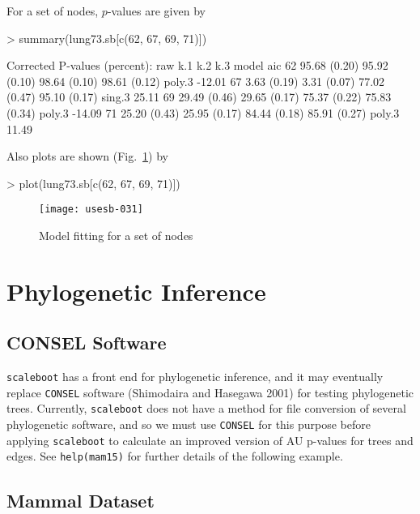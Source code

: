 \documentclass[a4paper]{amsart}
\begin{document}
For a set of nodes, $p$-values are given by
\begin{Schunk}
\begin{Sinput}
> summary(lung73.sb[c(62, 67, 69, 71)])
\end{Sinput}
\begin{Soutput}
Corrected P-values (percent):
   raw          k.1          k.2          k.3          model  aic    
62 95.68 (0.20) 95.92 (0.10) 98.64 (0.10) 98.61 (0.12) poly.3 -12.01 
67  3.63 (0.19)  3.31 (0.07) 77.02 (0.47) 95.10 (0.17) sing.3  25.11 
69 29.49 (0.46) 29.65 (0.17) 75.37 (0.22) 75.83 (0.34) poly.3 -14.09 
71 25.20 (0.43) 25.95 (0.17) 84.44 (0.18) 85.91 (0.27) poly.3  11.49 
\end{Soutput}
\end{Schunk}
Also plots are shown (Fig.~\ref{fig:lung73nodes}) by
\begin{Schunk}
\begin{Sinput}
> plot(lung73.sb[c(62, 67, 69, 71)])
\end{Sinput}
\end{Schunk}
\begin{figure}
\begin{center}
\texttt{[image: usesb-031]}
\caption{Model fitting for a set of nodes} \label{fig:lung73nodes}
\end{center}
\end{figure}

\section{Phylogenetic Inference}

\subsection{CONSEL Software}

{\tt scaleboot} has a front end for phylogenetic inference, and it may
eventually replace {\tt CONSEL} software (Shimodaira and Hasegawa
2001) for testing phylogenetic trees. Currently, {\tt scaleboot} does
not have a method for file conversion of several phylogenetic
software, and so we must use {\tt CONSEL} for this purpose before
applying {\tt scaleboot} to calculate an improved version of AU
p-values for trees and edges.  See {\tt help(mam15)} for further
details of the following example.

\subsection{Mammal Dataset}
\end{document}
